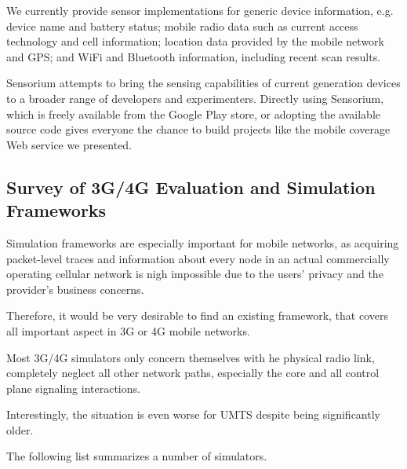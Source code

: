 We currently provide sensor implementations for generic device information, e.g. device name and battery status; mobile radio data such as current access technology and cell information; location data provided by the mobile network and \gls{GPS}; and  WiFi and Bluetooth information, including recent scan results.

Sensorium attempts to bring the sensing capabilities of current generation devices to a broader range of developers and experimenters. Directly using Sensorium, which is freely available from the Google Play store, or adopting the available source code gives everyone the chance to build projects like the mobile coverage Web service we presented.



\subsection{Survey of 3G/4G Evaluation and Simulation Frameworks}

Simulation frameworks are especially important for mobile networks, as acquiring packet-level traces and information about every node in an actual commercially operating cellular network is nigh impossible due to the users' privacy and the provider's business concerns.

Therefore, it would be very desirable to find an existing framework, that covers all important aspect in 3G or 4G mobile networks.

Most 3G/4G simulators only concern themselves with he physical radio link, completely neglect all other network paths, especially the core and all control plane signaling interactions.

Interestingly, the situation is even worse for \gls{UMTS} despite being significantly older.

The following list summarizes a number of simulators.

